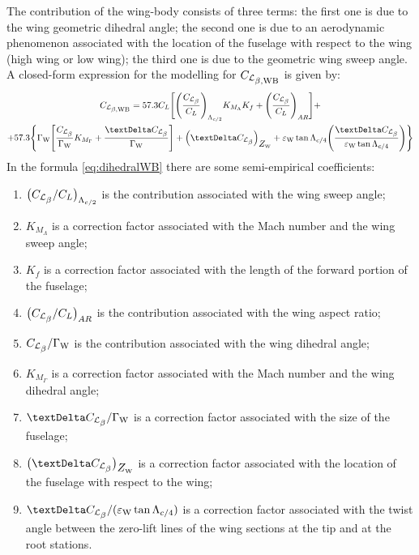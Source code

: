 The contribution of the wing-body consists of three terms: the first one is due to the wing geometric dihedral angle; the second one is due to an aerodynamic phenomenon associated with the location of the fuselage with respect to the wing (high wing or low wing); the third one is due to the geometric wing sweep angle. A closed-form expression for the modelling for $\CLbetaWB$  is given by:
\begin{multline}
\label{eq:dihedralWB}
\CLbetaWB = 57.3 \CLift \Biggl[ \Biggl(\frac{\CLbeta} {\CLift} \Biggr)_{\Lambda_{c/2}} K_{M_\Lambda}  K_{f} + \Biggl(\frac{\CLbeta} {\CLift} \Biggr)_{AR} \Biggr] + \\ + 57.3 \Biggl\{ \GammaW\Biggl[\frac{\CLbeta}{\GammaW}  K_{M_{\Gamma}} + \frac{\textrm \textDelta \CLbeta}{\GammaW}\Biggr] + \Bigl( \textrm \textDelta \CLbeta \Bigr)_{\ZW}+ \epsW \tan\Lambda_{c/4} \Biggl( \frac{\textrm \textDelta \CLbeta}{\epsW \tan \Lambda_{c/4}} \Biggr) \Biggr\}
\end{multline}
In the formula \ref{eq:dihedralWB} there are some semi-empirical coefficients:
\begin{enumerate}
\item \label{RollLiftLamb} $\bigl({\CLbeta}/{\CLift} \bigr)_{\Lambda_{c/2}}$ is the contribution associated with the wing sweep angle;
\item \label{KappaMLamb} $K_{M_\Lambda}$ is a correction factor associated with the Mach number and the wing sweep angle;
\item \label{Kappaf} $K_{f}$ is a correction factor associated with the length of the forward portion of the fuselage;
\item \label{RollLiftAR} $\bigl({\CLbeta}/{\CLift} \bigr)_{AR}$ is the contribution associated with the wing aspect ratio;
\item \label{RollGamma} ${\CLbeta}/{\GammaW}$ is the contribution associated with the wing dihedral angle;
\item \label{KappaMGamma} $K_{M_{\Gamma}}$ is a correction factor associated with the Mach number and the wing dihedral angle;
\item \label{DeltaRollGamma} ${\textrm \textDelta \CLbeta}/{{\GammaW}}$ is a correction factor associated with the size of the fuselage;
\item \label{DeltaRollZ} $\bigl( \textrm \textDelta \CLbeta \bigr)_{\ZW}$ is a correction factor associated with the location of the fuselage with respect to the wing;
\item \label{DeltaRollEps} ${\textrm \textDelta \CLbeta}/{(\epsW \tan \Lambda_{c/4})}$ is a correction factor associated with the twist angle \epsW between the zero-lift lines of the wing sections at the tip and at the root stations.
\end{enumerate}
